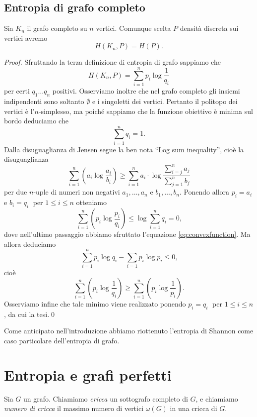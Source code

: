 \subsection{Entropia di grafo completo} 
\begin{proposition}
	Sia \(K_n\) il grafo completo su \(n\) vertici. Comunque scelta \(P\) densità discreta sui vertici avremo
	\[H(K_n,P)=H(P).\]
\end{proposition}
\begin{proof}
	Sfruttando la terza definizione di entropia di grafo sappiamo che
	\[H(K_n,P)=\sum_{i=1}^n p_i \log{\frac{1}{q_i}}\]
	per certi \(q_1\dots q_n\) positivi. Osserviamo inoltre che nel grafo completo gli insiemi indipendenti sono soltanto \(\emptyset\) e i singoletti dei vertici. Pertanto il politopo dei vertici è l'\(n\)-simplesso, ma poiché sappiamo che la funzione obiettivo è minima sul bordo deduciamo che
	\begin{equation} \label{eq:convexfunction}
	  \sum_{i=1}^n q_i = 1.
	\end{equation}
  Dalla disuguaglianza di Jensen segue la ben nota ``Log sum inequality'', cioè la disuguaglianza
  \[
    \sum_{i=1}^n{\left(a_i\log{\frac{a_i}{b_i}}\right)} \ge \sum_{i=1}^n{a_i}\cdot\log{\frac{\sum_{i=j}^n{a_j}}{\sum_{j=1}^n{b_j}}}
  \]
  per due \(n\)-uple di numeri non negativi \(a_1,\dots,a_n\) e \(b_1,\dots,b_n\).
  Ponendo allora \(p_i = a_i\) e \(b_i = q_i\;\) per \(1\le i\le n\) otteniamo
  \[
    \sum_{i=1}^n{\left(p_i\log{\frac{p_i}{q_i}}\right)} \le \log{\sum_{i=1}^n{q_i}} = 0\text{,}
  \]
  dove nell'ultimo passaggio abbiamo sfruttato l'equazione \eqref{eq:convexfunction}.
  Ma allora deduciamo
  \[
    \sum_{i=1}^n{p_i\log{q_i}} - \sum_{i=1}{p_i\log{p_i}} \le 0\text{,}
  \]
  cioè
  \[
    \sum_{i=1}^n{\left(p_i\log{\frac{1}{q_i}}\right)} \ge \sum_{i=1}^n{\left(p_i\log{\frac{1}{p_i}}\right)}\text{.}
  \]
  Osserviamo infine che tale minimo viene realizzato ponendo \(p_i = q_i\;\) per \(1\le i\le n\), da cui la tesi.\qed
\end{proof}
\begin{remark}
	Come anticipato nell'introduzione abbiamo riottenuto l'entropia di Shannon come caso particolare dell'entropia di grafo. 
\end{remark}

\section{Entropia e grafi perfetti} 
\begin{definition}
	Sia \(G\) un grafo. Chiamiamo \emph{cricca} un sottografo completo di \(G\), e chiamiamo \emph{numero di cricca} il massimo numero di vertici \(\omega(G)\) in una cricca di \(G\). 
\end{definition}

